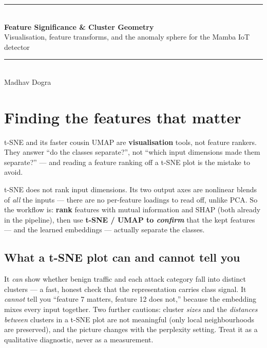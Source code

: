 \documentclass[11pt,a4paper]{article}
\begin{document}
\begin{center}
{\color{primary}\rule{\linewidth}{1pt}}\\[6pt]
{\Huge\bfseries\color{ink} Feature Significance \& Cluster Geometry} \\[6pt]
{\Large\color{secondary} Visualisation, feature transforms, and the anomaly sphere for the Mamba IoT detector} \\[4pt]
{\color{mute}\rule{0.6\linewidth}{0.3pt}}\\[4pt]
{\normalsize\color{mute} Madhav Dogra}
\end{center}

\vspace{4pt}

\section{Finding the features that matter}

t-SNE and its faster cousin UMAP are \textbf{visualisation} tools, not feature rankers. They answer ``do the classes separate?'', not ``which input dimensions made them separate?'' --- and reading a feature ranking off a t-SNE plot is the mistake to avoid.

\begin{tcolorbox}[idea]
t-SNE does not rank input dimensions. Its two output axes are nonlinear blends of \emph{all} the inputs --- there are no per-feature loadings to read off, unlike PCA. So the workflow is: \textbf{rank} features with mutual information and SHAP (both already in the pipeline), then use \textbf{t-SNE / UMAP to \emph{confirm}} that the kept features --- and the learned embeddings --- actually separate the classes.
\end{tcolorbox}

\subsection{What a t-SNE plot can and cannot tell you}
It \emph{can} show whether benign traffic and each attack category fall into distinct clusters --- a fast, honest check that the representation carries class signal. It \emph{cannot} tell you ``feature 7 matters, feature 12 does not,'' because the embedding mixes every input together. Two further cautions: cluster \emph{sizes} and the \emph{distances between} clusters in a t-SNE plot are not meaningful (only local neighbourhoods are preserved), and the picture changes with the perplexity setting. Treat it as a qualitative diagnostic, never as a measurement.
\end{document}
